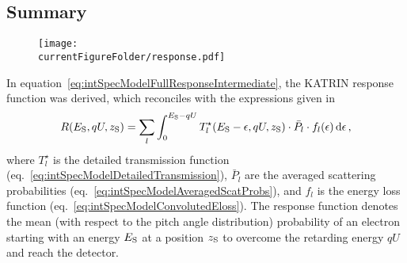 \subsection{Summary}
\label{sec:intSpecModelResponseSummary}
\begin{figure}
	\centering
	\texttt{[image: \\currentFigureFolder/response.pdf]}
	\label{fig:intSpecModelResponse}
\end{figure}
In equation~\eqref{eq:intSpecModelFullResponseIntermediate}, the KATRIN response function was derived, which reconciles with the expressions given in~\cite{Groh2015,Kleesiek2019}
\begin{equation}
\label{eq:intSpecModelResponse}
R(E_\mathrm{S}, qU, z_\mathrm{S}) =
\sum_{l}
	\int_{0}^{E_\mathrm{S}-qU}
		T_l^{\star}(E_\mathrm{S}-\epsilon,qU,z_\mathrm{S})
		\cdot \bar{P}_l \cdot f_l(\epsilon)
	\mathop{}\!\mathrm{d} \epsilon
\text{\,,}
\end{equation}
where $T_l^{\star}$ is the detailed transmission function (eq.~\ref{eq:intSpecModelDetailedTransmission}), $\bar{P}_l$ are the averaged scattering probabilities (eq.~\ref{eq:intSpecModelAveragedScatProbs}), and $f_l$ is the energy loss function (eq.~\ref{eq:intSpecModelConvolutedEloss}). The response function denotes the mean (with respect to the pitch angle distribution) probability of an electron starting with an energy $E_\mathrm{S}$ at a position $z_\mathrm{S}$ to overcome the retarding energy $qU$ and reach the detector. 

